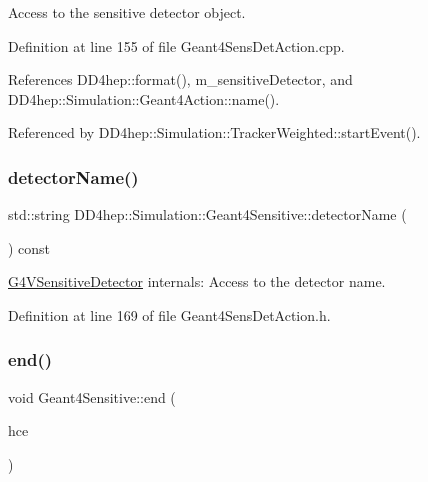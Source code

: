 Access to the sensitive detector object. 



Definition at line 155 of file Geant4\+Sens\+Det\+Action.\+cpp.



References D\+D4hep\+::format(), m\+\_\+sensitive\+Detector, and D\+D4hep\+::\+Simulation\+::\+Geant4\+Action\+::name().



Referenced by D\+D4hep\+::\+Simulation\+::\+Tracker\+Weighted\+::start\+Event().

\hypertarget{class_d_d4hep_1_1_simulation_1_1_geant4_sensitive_ab24cad7581e1288f7c3ac3502c81e377}{}\label{class_d_d4hep_1_1_simulation_1_1_geant4_sensitive_ab24cad7581e1288f7c3ac3502c81e377} 
\subsubsection{\texorpdfstring{detector\+Name()}{detectorName()}}
{\footnotesize\ttfamily std\+::string D\+D4hep\+::\+Simulation\+::\+Geant4\+Sensitive\+::detector\+Name (\begin{DoxyParamCaption}{ }\end{DoxyParamCaption}) const\hspace{0.3cm}{\ttfamily [inline]}}



\hyperlink{class_g4_v_sensitive_detector}{G4\+V\+Sensitive\+Detector} internals\+: Access to the detector name. 



Definition at line 169 of file Geant4\+Sens\+Det\+Action.\+h.

\hypertarget{class_d_d4hep_1_1_simulation_1_1_geant4_sensitive_abcce05101539a9941c06aada4625a608}{}\label{class_d_d4hep_1_1_simulation_1_1_geant4_sensitive_abcce05101539a9941c06aada4625a608} 
\subsubsection{\texorpdfstring{end()}{end()}}
{\footnotesize\ttfamily void Geant4\+Sensitive\+::end (\begin{DoxyParamCaption}\item[{G4\+H\+Cof\+This\+Event $\ast$}]{hce }\end{DoxyParamCaption})\hspace{0.3cm}{\ttfamily [virtual]}}



